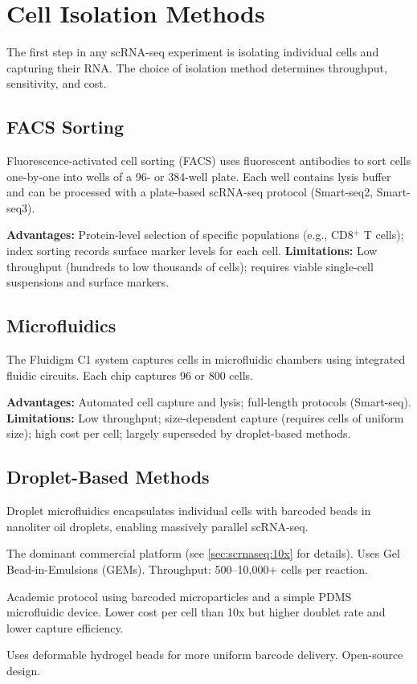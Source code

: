 \section{Cell Isolation Methods}
\label{sec:scrnaseq:isolation}

The first step in any scRNA-seq experiment is isolating individual cells and
capturing their RNA. The choice of isolation method determines throughput,
sensitivity, and cost.

\subsection{FACS Sorting}

Fluorescence-activated cell sorting (FACS) uses fluorescent antibodies to sort
cells one-by-one into wells of a 96- or 384-well plate. Each well contains
lysis buffer and can be processed with a plate-based scRNA-seq protocol
(Smart-seq2, Smart-seq3).

\textbf{Advantages:} Protein-level selection of specific populations (e.g.,
CD8$^+$ T cells); index sorting records surface marker levels for each cell.
\textbf{Limitations:} Low throughput (hundreds to low thousands of cells);
requires viable single-cell suspensions and surface markers.

\subsection{Microfluidics}

The Fluidigm C1 system captures cells in microfluidic chambers using
integrated fluidic circuits. Each chip captures 96 or 800 cells.

\textbf{Advantages:} Automated cell capture and lysis; full-length protocols
(Smart-seq).
\textbf{Limitations:} Low throughput; size-dependent capture (requires cells of
uniform size); high cost per cell; largely superseded by droplet-based methods.

\subsection{Droplet-Based Methods}
\label{sec:scrnaseq:droplet}

Droplet microfluidics encapsulates individual cells with barcoded beads in
nanoliter oil droplets, enabling massively parallel scRNA-seq.

\begin{description}[style=nextline]
  \item[10x Genomics Chromium] The dominant commercial platform (see
    \cref{sec:scrnaseq:10x} for details). Uses Gel Bead-in-Emulsions (GEMs).
    Throughput: 500--10,000+ cells per reaction.
  \item[Drop-seq] Academic protocol using barcoded microparticles and a simple
    PDMS microfluidic device. Lower cost per cell than 10x but higher doublet
    rate and lower capture efficiency.
  \item[inDrop] Uses deformable hydrogel beads for more uniform barcode
    delivery. Open-source design.
\end{description}

